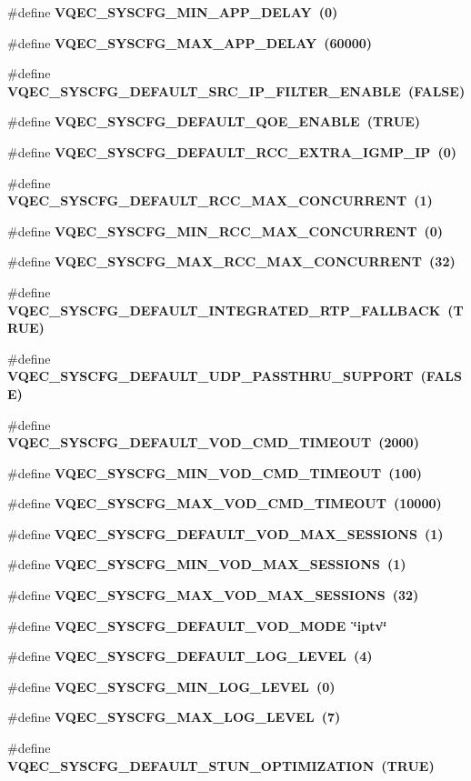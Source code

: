 \begin{CompactItemize}
$$\item 
\#define \bf{VQEC\_\-SYSCFG\_\-MIN\_\-APP\_\-DELAY}~(0)
\item 
\#define \bf{VQEC\_\-SYSCFG\_\-MAX\_\-APP\_\-DELAY}~(60000)
\item 
\#define \bf{VQEC\_\-SYSCFG\_\-DEFAULT\_\-SRC\_\-IP\_\-FILTER\_\-ENABLE}~(\bf{FALSE})
\item 
\#define \bf{VQEC\_\-SYSCFG\_\-DEFAULT\_\-QOE\_\-ENABLE}~(\bf{TRUE})
\item 
\#define \bf{VQEC\_\-SYSCFG\_\-DEFAULT\_\-RCC\_\-EXTRA\_\-IGMP\_\-IP}~(0)
\item 
\#define \bf{VQEC\_\-SYSCFG\_\-DEFAULT\_\-RCC\_\-MAX\_\-CONCURRENT}~(1)
\item 
\#define \bf{VQEC\_\-SYSCFG\_\-MIN\_\-RCC\_\-MAX\_\-CONCURRENT}~(0)
\item 
\#define \bf{VQEC\_\-SYSCFG\_\-MAX\_\-RCC\_\-MAX\_\-CONCURRENT}~(32)
\item 
\#define \bf{VQEC\_\-SYSCFG\_\-DEFAULT\_\-INTEGRATED\_\-RTP\_\-FALLBACK}~(\bf{TRUE})
\item 
\#define \bf{VQEC\_\-SYSCFG\_\-DEFAULT\_\-UDP\_\-PASSTHRU\_\-SUPPORT}~(\bf{FALSE})
\item 
\#define \bf{VQEC\_\-SYSCFG\_\-DEFAULT\_\-VOD\_\-CMD\_\-TIMEOUT}~(2000)
\item 
\#define \bf{VQEC\_\-SYSCFG\_\-MIN\_\-VOD\_\-CMD\_\-TIMEOUT}~(100)
\item 
\#define \bf{VQEC\_\-SYSCFG\_\-MAX\_\-VOD\_\-CMD\_\-TIMEOUT}~(10000)
\item 
\#define \bf{VQEC\_\-SYSCFG\_\-DEFAULT\_\-VOD\_\-MAX\_\-SESSIONS}~(1)
\item 
\#define \bf{VQEC\_\-SYSCFG\_\-MIN\_\-VOD\_\-MAX\_\-SESSIONS}~(1)
\item 
\#define \bf{VQEC\_\-SYSCFG\_\-MAX\_\-VOD\_\-MAX\_\-SESSIONS}~(32)
\item 
\#define \bf{VQEC\_\-SYSCFG\_\-DEFAULT\_\-VOD\_\-MODE}~\char`\"{}iptv\char`\"{}
\item 
\#define \bf{VQEC\_\-SYSCFG\_\-DEFAULT\_\-LOG\_\-LEVEL}~(4)
\item 
\#define \bf{VQEC\_\-SYSCFG\_\-MIN\_\-LOG\_\-LEVEL}~(0)
\item 
\#define \bf{VQEC\_\-SYSCFG\_\-MAX\_\-LOG\_\-LEVEL}~(7)
\item 
\#define \bf{VQEC\_\-SYSCFG\_\-DEFAULT\_\-STUN\_\-OPTIMIZATION}~(\bf{TRUE})
\end{CompactItemize}
